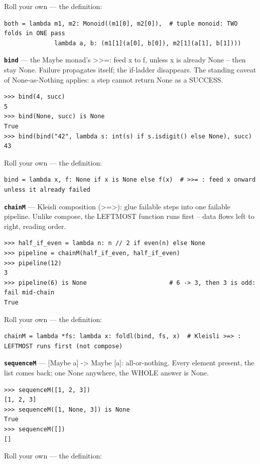 \documentclass[10pt,letterpaper]{article}
\begin{document}
Roll your own --- the definition:

\begin{lstlisting}[style=ex]
both = lambda m1, m2: Monoid((m1[0], m2[0]),  # tuple monoid: TWO folds in ONE pass
              lambda a, b: (m1[1](a[0], b[0]), m2[1](a[1], b[1])))
\end{lstlisting}
\textbf{\texttt{bind}} --- the Maybe monad's >>=: feed x to f, unless x is already None -- then stay None. Failure propagates itself; the if-ladder disappears. The standing caveat of None-as-Nothing applies: a step cannot return None as a SUCCESS.
\begin{lstlisting}[style=ex]
>>> bind(4, succ)
5
>>> bind(None, succ) is None
True
>>> bind(bind("42", lambda s: int(s) if s.isdigit() else None), succ)
43
\end{lstlisting}

Roll your own --- the definition:

\begin{lstlisting}[style=ex]
bind = lambda x, f: None if x is None else f(x)  # >>= : feed x onward unless it already failed
\end{lstlisting}
\textbf{\texttt{chainM}} --- Kleisli composition (>=>): glue failable steps into one failable pipeline. Unlike compose, the LEFTMOST function runs first -- data flows left to right, reading order.
\begin{lstlisting}[style=ex]
>>> half_if_even = lambda n: n // 2 if even(n) else None
>>> pipeline = chainM(half_if_even, half_if_even)
>>> pipeline(12)
3
>>> pipeline(6) is None                       # 6 -> 3, then 3 is odd: fail mid-chain
True
\end{lstlisting}

Roll your own --- the definition:

\begin{lstlisting}[style=ex]
chainM = lambda *fs: lambda x: foldl(bind, fs, x)  # Kleisli >=> : LEFTMOST runs first (not compose)
\end{lstlisting}
\textbf{\texttt{sequenceM}} --- [Maybe a] -> Maybe [a]: all-or-nothing. Every element present, the list comes back; one None anywhere, the WHOLE answer is None.
\begin{lstlisting}[style=ex]
>>> sequenceM([1, 2, 3])
[1, 2, 3]
>>> sequenceM([1, None, 3]) is None
True
>>> sequenceM([])
[]
\end{lstlisting}

Roll your own --- the definition:
\end{document}
